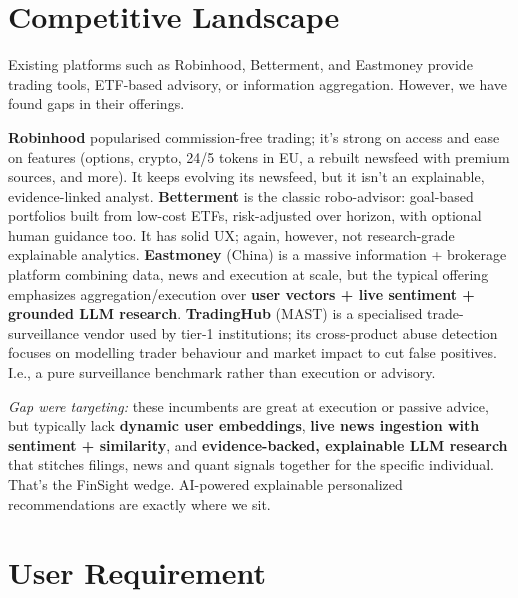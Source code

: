 \section{Competitive Landscape}

Existing platforms such as Robinhood, Betterment, and Eastmoney provide trading tools, ETF-based advisory, or information aggregation. However, we have found gaps in their offerings.

\textbf{Robinhood} popularised commission-free trading; it's strong on access and ease on features (options, crypto, 24/5 tokens in EU, a rebuilt newsfeed with premium sources, and more). It keeps evolving its newsfeed, but it isn’t an explainable, evidence-linked analyst. \parencite{reuters_robinhood_tokens_2025,hood_newsfeed_2019,hood_crypto_2024,hood_site} \textbf{Betterment} is the classic robo-advisor: goal-based portfolios built from low-cost \acs{ETF}s, risk-adjusted over horizon, with optional human guidance too. It has solid UX; again, however, not research-grade explainable analytics. \parencite{forbes_betterment_2025,wsj_betterment_2025,betterment_site} \textbf{Eastmoney} (China) is a massive information + brokerage platform combining data, news and execution at scale, but the typical offering emphasizes aggregation/execution over \textbf{user vectors + live sentiment + grounded LLM research}. \parencite{eastmoney_reuters, eastmoney_forbes} \textbf{TradingHub} (MAST) is a specialised trade-surveillance vendor used by tier-1 institutions; its cross-product abuse detection focuses on modelling trader behaviour and market impact to cut false positives. I.e., a pure surveillance benchmark rather than execution or advisory. \parencite{tradinghub_trade_surv_2025,summit_tradinghub_2023}

\textit{Gap we\’re targeting:} these incumbents are great at execution or passive advice, but typically lack \textbf{dynamic user embeddings}, \textbf{live news ingestion with sentiment + similarity}, and \textbf{evidence-backed, explainable \acs{LLM} research} that stitches filings, news and quant signals together for the specific individual. That’s the FinSight wedge. AI-powered explainable personalized recommendations are exactly where we sit.

\section{User Requirement}

